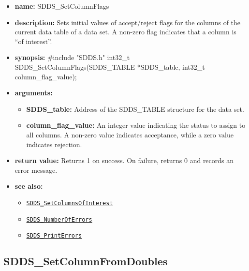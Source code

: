 \documentclass[11pt]{article}
\newcommand{\progref}[1]{\hyperref[SDDS_#1]{\tt SDDS\_#1}}
\begin{document}
\begin{itemize}
\item {\bf name:}\newline
SDDS\_SetColumnFlags
\item {\bf description:}\newline
Sets initial values of accept/reject flags for the columns of the current data table of a data set. A non-zero flag indicates that a column is ``of interest''.
\item {\bf synopsis:} \#include "SDDS.h"\newline
int32\_t SDDS\_SetColumnFlags(SDDS\_TABLE *SDDS\_table, int32\_t column\_flag\_value);
\item {\bf arguments:}
\begin{itemize}
\item {\bf SDDS\_table:} Address of the SDDS\_TABLE structure for the data set.
\item {\bf column\_flag\_value:} An integer value indicating the status to assign to all columns. A non-zero value indicates acceptance, while a zero value indicates rejection.
\end{itemize}
\item {\bf return value:}\newline
Returns 1 on success. On failure, returns 0 and records an error message.
\item {\bf see also:}
\begin{itemize}
\item \progref{SetColumnsOfInterest}
\item \progref{NumberOfErrors}
\item \progref{PrintErrors}
\end{itemize}
\end{itemize}

\subsection{SDDS\_SetColumnFromDoubles}
\label{SDDS_SetColumnFromDoubles}
\end{document}
